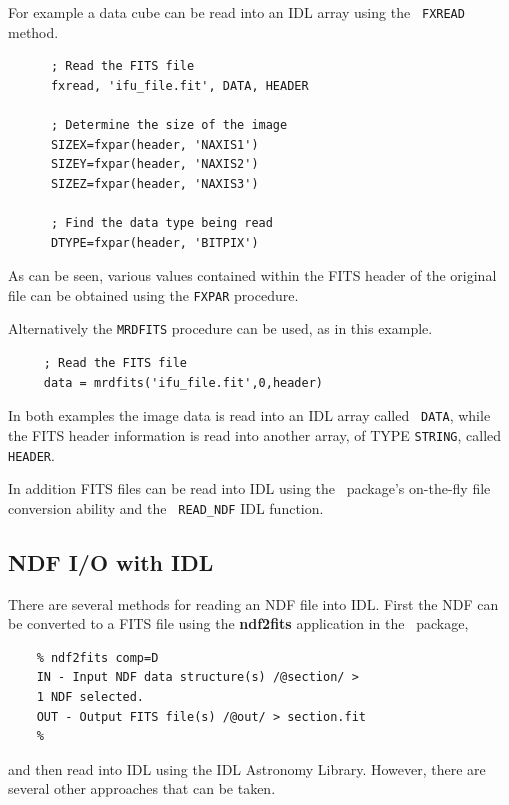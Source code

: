 \documentclass[twoside,11pt]{article}
\newcommand{\htmladdnormallink}[2]{#1}
\newcommand{\xref}[3]{#1}
\newcommand{\xlabel}[1]{}
\begin{document}
For example a data cube can be read into an IDL array using the {\tt
FXREAD} method.

\small\begin{verbatim}
      ; Read the FITS file
      fxread, 'ifu_file.fit', DATA, HEADER
 
      ; Determine the size of the image
      SIZEX=fxpar(header, 'NAXIS1')
      SIZEY=fxpar(header, 'NAXIS2')
      SIZEZ=fxpar(header, 'NAXIS3')
 
      ; Find the data type being read
      DTYPE=fxpar(header, 'BITPIX')
\end{verbatim}\normalsize

As can be seen, various values contained within the FITS header of the
original file can be obtained using the {\tt FXPAR} procedure.

Alternatively the {\tt MRDFITS} procedure can be used, as in this
example.

\small\begin{verbatim}
     ; Read the FITS file
     data = mrdfits('ifu_file.fit',0,header)
\end{verbatim}\normalsize

In both examples the image data is read into an IDL array called {\tt
DATA}, while the FITS header information is read into another array,
of TYPE {\tt STRING}, called {\tt HEADER}.

In addition FITS files can be read into IDL using the
\CONVERTref\normalsize\ package's \xref{on-the-fly file conversion}{sun55}{sect_auto}
ability and the \xref{{\tt
READ\_NDF}}{sun55}{READ_NDF} IDL function.
 
\subsection{\xlabel{sc16_ndfidl}NDF I/O with IDL\label{sc16_ndfidl}}

There are several methods for reading an \xref{NDF}{sun33}{} file into
IDL.  First the NDF can be converted to a FITS file using the
\xref{{\bf ndf2fits}}{sun55}{NDF2FITS} application in the \CONVERTref\
package,

\small\begin{verbatim}
    % ndf2fits comp=D
    IN - Input NDF data structure(s) /@section/ > 
    1 NDF selected.
    OUT - Output FITS file(s) /@out/ > section.fit
    %
\end{verbatim}\normalsize

and then read into IDL using the \htmladdnormallink{IDL Astronomy
Library}{http://idlastro.gsfc.nasa.gov/homepage.html}\latexonly{ (as
in Section~\ref{sc16_fitsidl})}.  However, there are several other
approaches that can be taken.
\end{document}
